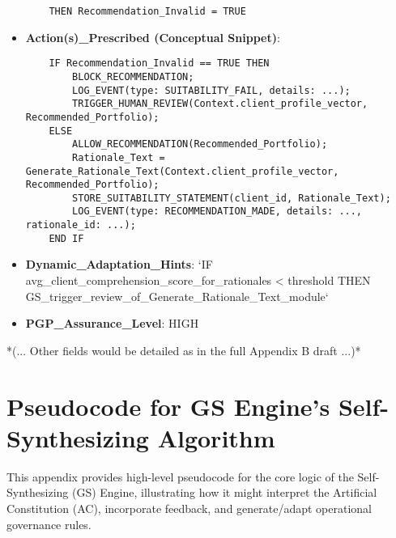 \documentclass[sigconf,review,anonymous=false]{acmart} %
\begin{document}
\begin{itemize}
\begin{verbatim}
    THEN Recommendation_Invalid = TRUE
    \end{verbatim}
    \item \textbf{Action(s)\_Prescribed (Conceptual Snippet)}:
    \begin{verbatim}
    IF Recommendation_Invalid == TRUE THEN
        BLOCK_RECOMMENDATION;
        LOG_EVENT(type: SUITABILITY_FAIL, details: ...);
        TRIGGER_HUMAN_REVIEW(Context.client_profile_vector, Recommended_Portfolio);
    ELSE
        ALLOW_RECOMMENDATION(Recommended_Portfolio);
        Rationale_Text = Generate_Rationale_Text(Context.client_profile_vector, Recommended_Portfolio);
        STORE_SUITABILITY_STATEMENT(client_id, Rationale_Text);
        LOG_EVENT(type: RECOMMENDATION_MADE, details: ..., rationale_id: ...);
    END IF
    \end{verbatim}
    \item \textbf{Dynamic\_Adaptation\_Hints}: `IF avg_client_comprehension_score_for_rationales < threshold THEN GS_trigger_review_of_Generate_Rationale_Text_module`
    \item \textbf{PGP\_Assurance\_Level}: HIGH
\end{itemize}
*(... Other fields would be detailed as in the full Appendix B draft ...)*

\section{Pseudocode for GS Engine's Self-Synthesizing Algorithm}
\label{app:gs_pseudocode}
This appendix provides high-level pseudocode for the core logic of the Self-Synthesizing (GS) Engine, illustrating how it might interpret the Artificial Constitution (AC), incorporate feedback, and generate/adapt operational governance rules.
\end{document}
